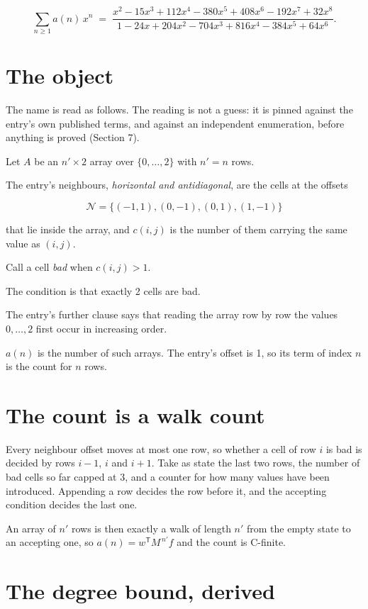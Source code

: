 \documentclass[11pt]{article}
\theoremstyle{definition}
\begin{document}
\[\sum_{n \ge 1} a(n)\,x^n \;=\; \frac{x^{2} - 15x^{3} + 112x^{4} - 380x^{5} + 408x^{6} - 192x^{7} + 32x^{8}}{1 - 24x + 204x^{2} - 704x^{3} + 816x^{4} - 384x^{5} + 64x^{6}}.\]

\section{The object}

The name is read as follows. The reading is not a guess: it is pinned against the entry's own published terms, and against an independent enumeration, before anything is proved (Section 7).

Let $A$ be an $n' \times 2$ array over $\{0,\dots,2\}$ with $n' = n$ rows.

The entry's neighbours, {\itshape horizontal and antidiagonal}, are the cells at the offsets

\[\mathcal{N} = \{(-1,1), (0,-1), (0,1), (1,-1)\}\]

that lie inside the array, and $c(i,j)$ is the number of them carrying the same value as $(i,j)$.

Call a cell {\itshape bad} when $c(i,j) > 1$.

The condition is that exactly 2 cells are bad.

The entry's further clause says that reading the array row by row the values $0,\dots,2$ first occur in increasing order.

$a(n)$ is the number of such arrays. The entry's offset is 1, so its term of index $n$ is the count for $n$ rows.

\section{The count is a walk count}

Every neighbour offset moves at most one row, so whether a cell of row $i$ is bad is decided by rows $i-1$, $i$ and $i+1$. Take as state the last two rows, the number of bad cells so far capped at 3, and a counter for how many values have been introduced. Appending a row decides the row before it, and the accepting condition decides the last one.

An array of $n'$ rows is then exactly a walk of length $n'$ from the empty state to an accepting one, so $a(n) = w^{\mathsf T}M^{\,n'}f$ and the count is C-finite.

\section{The degree bound, derived}
\end{document}
